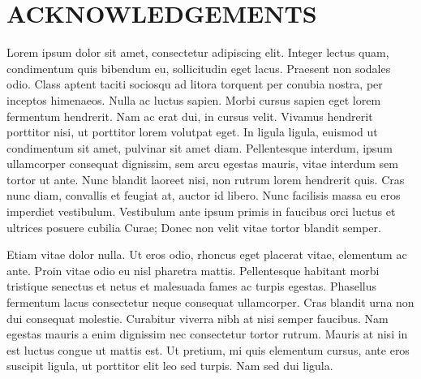 %
%
%


\chapter*{ACKNOWLEDGEMENTS}


\indent Lorem ipsum dolor sit amet, consectetur adipiscing elit. Integer lectus quam, condimentum quis bibendum eu, sollicitudin eget lacus. Praesent non sodales odio. Class aptent taciti sociosqu ad litora torquent per conubia nostra, per inceptos himenaeos. Nulla ac luctus sapien. Morbi cursus sapien eget lorem fermentum hendrerit. Nam ac erat dui, in cursus velit. Vivamus hendrerit porttitor nisi, ut porttitor lorem volutpat eget. In ligula ligula, euismod ut condimentum sit amet, pulvinar sit amet diam. Pellentesque interdum, ipsum ullamcorper consequat dignissim, sem arcu egestas mauris, vitae interdum sem tortor ut ante. Nunc blandit laoreet nisi, non rutrum lorem hendrerit quis. Cras nunc diam, convallis et feugiat at, auctor id libero. Nunc facilisis massa eu eros imperdiet vestibulum. Vestibulum ante ipsum primis in faucibus orci luctus et ultrices posuere cubilia Curae; Donec non velit vitae tortor blandit semper.

Etiam vitae dolor nulla. Ut eros odio, rhoncus eget placerat vitae, elementum ac ante. Proin vitae odio eu nisl pharetra mattis. Pellentesque habitant morbi tristique senectus et netus et malesuada fames ac turpis egestas. Phasellus fermentum lacus consectetur neque consequat ullamcorper. Cras blandit urna non dui consequat molestie. Curabitur viverra nibh at nisi semper faucibus. Nam egestas mauris a enim dignissim nec consectetur tortor rutrum. Mauris at nisi in est luctus congue ut mattis est. Ut pretium, mi quis elementum cursus, ante eros suscipit ligula, ut porttitor elit leo sed turpis. Nam sed dui ligula.


\pagebreak{}